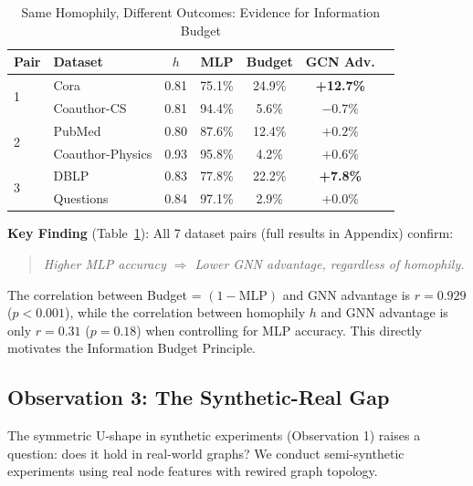 \begin{table}[t]
\centering
\caption{Same Homophily, Different Outcomes: Evidence for Information Budget}
\label{tab:same_h_different_outcome}
\begin{tabular}{@{}llccccc@{}}
\toprule
\textbf{Pair} & \textbf{Dataset} & \textbf{$h$} & \textbf{MLP} & \textbf{Budget} & \textbf{GCN Adv.} \\
\midrule
\multirow{2}{*}{1} & Cora & 0.81 & 75.1\% & 24.9\% & \textbf{+12.7\%} \\
 & Coauthor-CS & 0.81 & 94.4\% & 5.6\% & $-0.7\%$ \\
\midrule
\multirow{2}{*}{2} & PubMed & 0.80 & 87.6\% & 12.4\% & $+0.2\%$ \\
 & Coauthor-Physics & 0.93 & 95.8\% & 4.2\% & $+0.6\%$ \\
\midrule
\multirow{2}{*}{3} & DBLP & 0.83 & 77.8\% & 22.2\% & \textbf{+7.8\%} \\
 & Questions & 0.84 & 97.1\% & 2.9\% & $+0.0\%$ \\
\bottomrule
\end{tabular}
\end{table}

\textbf{Key Finding} (Table~\ref{tab:same_h_different_outcome}): All 7 dataset pairs (full results in Appendix) confirm:
\begin{quote}
\textit{Higher MLP accuracy $\Rightarrow$ Lower GNN advantage, regardless of homophily.}
\end{quote}

The correlation between Budget = $(1 - \text{MLP})$ and GNN advantage is $r = 0.929$ ($p < 0.001$), while the correlation between homophily $h$ and GNN advantage is only $r = 0.31$ ($p = 0.18$) when controlling for MLP accuracy. This directly motivates the Information Budget Principle.

\subsection{Observation 3: The Synthetic-Real Gap}
\label{sec:gap_obs}

The symmetric U-shape in synthetic experiments (Observation 1) raises a question: does it hold in real-world graphs? We conduct semi-synthetic experiments using real node features with rewired graph topology.

